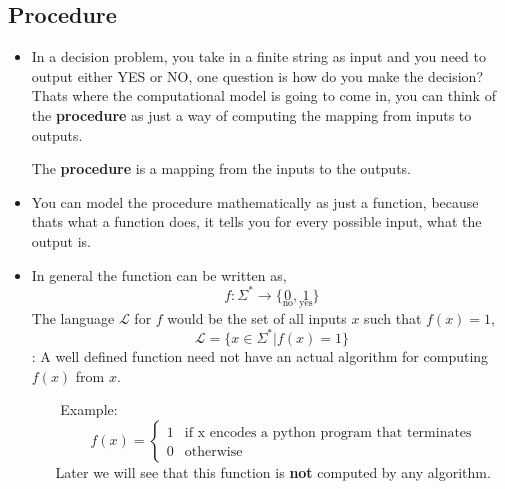 \documentclass{article}
\begin{document}

\subsection*{Procedure}
\begin{figure}[H]
    \caption*{}
\end{figure}

\begin{itemize}
    \item In a decision problem, you take in a finite string as input and you need to output either YES or NO, one question is how do you make the decision? Thats where the computational model is going to come in, you can think of the \textbf{procedure} as just a way of computing the mapping from inputs to outputs.
    \begin{tcolorbox} [title= Definition:, colback=black!10!white]
        The \textbf{procedure} is a mapping from the inputs to the outputs.
    \end{tcolorbox}
    \item You can model the procedure mathematically as just a function, because thats what a function does, it tells you for every possible input, what the output is.
    \item In general the function can be written as, $$f:\Sigma^*\rightarrow\{\underset{\text{no}}{0},\underset{\text{yes}}{1}\}$$
    The language $\mathcal{L}$ for $f$ would be the set of all inputs $x$ such that $f(x)=1$, $$ \mathcal{L}=\{x\in\Sigma^*|f(x)=1\}$$
    : A well defined function need not have an actual algorithm for computing $f(x)$ from $x$.
    \begin{itemize}
        \item [$ $] Example: 
        \[
            f(x) =
            \begin{cases}
                1 & \text{if x encodes a python program that terminates}\\
                0 & \text{otherwise}
            \end{cases}
        \]
        Later we will see that this function is \textbf{not} computed by any algorithm.
    \end{itemize}
\end{itemize}
\end{document}
